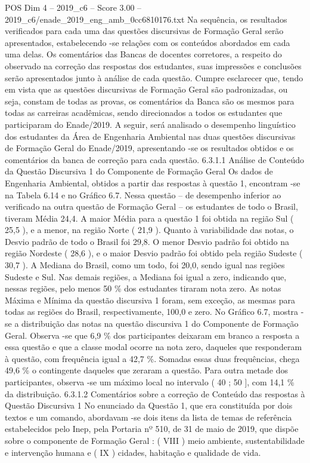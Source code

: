 \begin{textsample}{POS Dim 4 – 2019\_c6 – Score 3.00 – 2019\_c6/enade\_2019\_eng\_amb\_0cc6810176.txt}
Na sequência, os resultados verificados para cada uma das questões discursivas de Formação Geral serão apresentados, estabelecendo -se relações com os conteúdos abordados em cada uma delas.
Os comentários das Bancas de docentes corretores, a respeito do observado na correção das respostas dos estudantes, suas impressões e conclusões serão apresentados junto à análise de cada questão.
Cumpre esclarecer que, tendo em vista que as questões discursivas de Formação Geral são padronizadas, ou seja, constam de todas as provas, os comentários da Banca são os mesmos para todas as carreiras acadêmicas, sendo direcionados a todos os estudantes que participaram do Enade/2019.
A seguir, será analisado o desempenho linguístico dos estudantes da Área de Engenharia Ambiental nas duas questões discursivas de Formação Geral do Enade/2019, apresentando -se os resultados obtidos e os comentários da banca de correção para cada questão. 6.3.1.1 Análise de Conteúdo da Questão Discursiva 1 do Componente de Formação Geral Os dados de Engenharia Ambiental, obtidos a partir das respostas à questão 1, encontram -se na Tabela 6.14 e no Gráfico 6.7.
Nessa questão – de desempenho inferior ao verificado na outra questão de Formação Geral – os estudantes de todo o Brasil, tiveram Média 24,4.
A maior Média para a questão 1 foi obtida na região Sul ( 25,5 ), e a menor, na região Norte ( 21,9 ).
Quanto à variabilidade das notas, o Desvio padrão de todo o Brasil foi 29,8.
O menor Desvio padrão foi obtido na região Nordeste ( 28,6 ), e o maior Desvio padrão foi obtido pela região Sudeste ( 30,7 ).
A Mediana do Brasil, como um todo, foi 20,0, sendo igual nas regiões Sudeste e Sul.
Nas demais regiões, a Mediana foi igual a zero, indicando que, nessas regiões, pelo menos 50 \% dos estudantes tiraram nota zero.
As notas Máxima e Mínima da questão discursiva 1 foram, sem exceção, as mesmas para todas as regiões do Brasil, respectivamente, 100,0 e zero.
No Gráfico 6.7, mostra -se a distribuição das notas na questão discursiva 1 do Componente de Formação Geral.
Observa -se que 6,9 \% dos participantes deixaram em branco a resposta a essa questão e que a classe modal ocorre na nota zero, daqueles que responderam à questão, com frequência igual a 42,7 \%.
Somadas essas duas frequências, chega 49,6 \% o contingente daqueles que zeraram a questão.
Para outra metade dos participantes, observa -se um máximo local no intervalo ( 40 ; 50 ], com 14,1 \% da distribuição. 6.3.1.2 Comentários sobre a correção de Conteúdo das respostas à Questão Discursiva 1 No enunciado da Questão 1, que era constituída por dois textos e um comando, abordavam -se dois itens da lista de temas de referência estabelecidos pelo Inep, pela Portaria nº 510, de 31 de maio de 2019, que dispõe sobre o componente de Formação Geral : ( VIII ) meio ambiente, sustentabilidade e intervenção humana e ( IX ) cidades, habitação e qualidade de vida.

\end{textsample}

